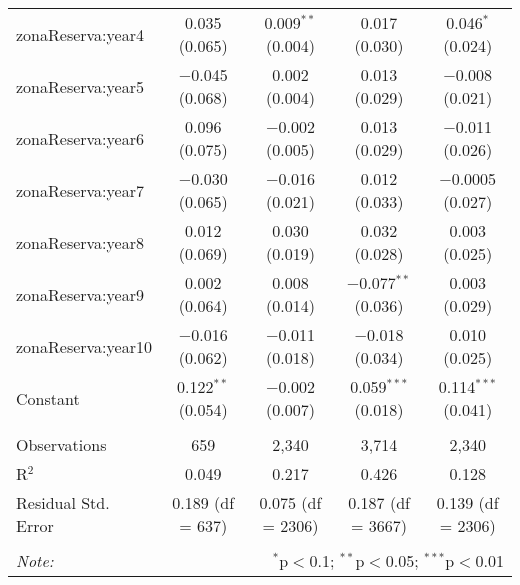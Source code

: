 \documentclass[utf8]{frontiers_suppmat} %
\theoremstyle{definition}
\theoremstyle{definition}
\theoremstyle{definition}
\theoremstyle{remark}
\begin{document}
\begin{table}[!htbp]
\begin{tabular}{@{\extracolsep{1pt}}lcccc}
  zonaReserva:year4 & 0.035 (0.065) & 0.009$^{**}$ (0.004) & 0.017 (0.030) & 0.046$^{*}$ (0.024) \\ 
  zonaReserva:year5 & $-$0.045 (0.068) & 0.002 (0.004) & 0.013 (0.029) & $-$0.008 (0.021) \\ 
  zonaReserva:year6 & 0.096 (0.075) & $-$0.002 (0.005) & 0.013 (0.029) & $-$0.011 (0.026) \\ 
  zonaReserva:year7 & $-$0.030 (0.065) & $-$0.016 (0.021) & 0.012 (0.033) & $-$0.0005 (0.027) \\ 
  zonaReserva:year8 & 0.012 (0.069) & 0.030 (0.019) & 0.032 (0.028) & 0.003 (0.025) \\ 
  zonaReserva:year9 & 0.002 (0.064) & 0.008 (0.014) & $-$0.077$^{**}$ (0.036) & 0.003 (0.029) \\ 
  zonaReserva:year10 & $-$0.016 (0.062) & $-$0.011 (0.018) & $-$0.018 (0.034) & 0.010 (0.025) \\ 
  Constant & 0.122$^{**}$ (0.054) & $-$0.002 (0.007) & 0.059$^{***}$ (0.018) & 0.114$^{***}$ (0.041) \\ 
 \hline \\[-1.8ex] 
Observations & 659 & 2,340 & 3,714 & 2,340 \\ 
R$^{2}$ & 0.049 & 0.217 & 0.426 & 0.128 \\ 
Residual Std. Error & 0.189 (df = 637) & 0.075 (df = 2306) & 0.187 (df = 3667) & 0.139 (df = 2306) \\ 
\hline 
\hline \\[-1.8ex] 
\textit{Note:}  & \multicolumn{4}{r}{$^{*}$p$<$0.1; $^{**}$p$<$0.05; $^{***}$p$<$0.01} \\ 
\end{tabular} 
\end{table}
\end{document}
